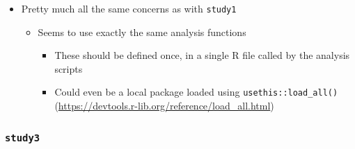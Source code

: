 \documentclass[
]{article}
\providecommand{\tightlist}{%
  \setlength{\itemsep}{0pt}\setlength{\parskip}{0pt}}
\begin{document}
\begin{itemize}
\tightlist
\item
  Pretty much all the same concerns as with \texttt{study1}

  \begin{itemize}
  \tightlist
  \item
    Seems to use exactly the same analysis functions

    \begin{itemize}
    \tightlist
    \item
      These should be defined once, in a single R file called by the analysis scripts
    \item
      Could even be a local package loaded using \texttt{usethis::load\_all()} (\url{https://devtools.r-lib.org/reference/load_all.html})
    \end{itemize}
  \end{itemize}
\end{itemize}

\hypertarget{study3}{%
\subsubsection{\texorpdfstring{\texttt{study3}}{study3}}\label{study3}}
\end{document}
